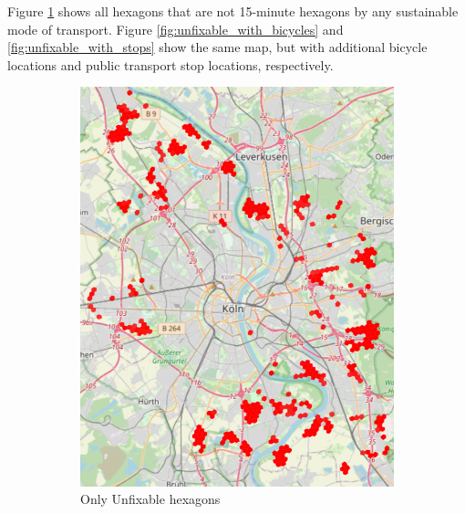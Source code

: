 Figure \ref{fig:only_unfixable_hexagons} shows all hexagons that are not 15-minute hexagons by any sustainable mode of transport.
Figure \ref{fig:unfixable_with_bicycles} and \ref{fig:unfixable_with_stops} show the same map, but with additional bicycle locations and public transport stop locations, respectively.
\begin{figure}
     \centering
     \begin{subfigure}[b]{0.30\textwidth}
         \centering
         \includegraphics[width=\textwidth]{Figures/results/problematic_hexagons/unfixable.png}
         \caption{Only Unfixable hexagons}
         \label{fig:only_unfixable_hexagons}
     \end{subfigure}
     \hfill
     \begin{subfigure}[b]{0.30\textwidth}
         \centering

\end{subfigure}
\end{figure}
